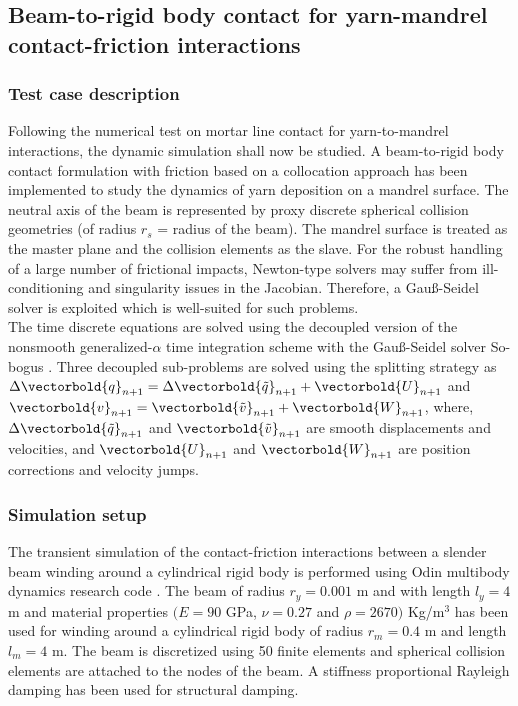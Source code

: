 \subsection{Beam-to-rigid body contact for yarn-mandrel contact-friction interactions}
\subsubsection{Test case description}
Following the numerical test on mortar line contact for yarn-to-mandrel interactions, the dynamic simulation shall now be studied. A beam-to-rigid body contact formulation with friction based on a collocation approach has been implemented to study the dynamics of yarn deposition on a mandrel surface. The neutral axis of the beam is represented by proxy discrete spherical collision geometries \cite{tasora2020geometrically} (of radius $r_s$ = radius of the beam). The mandrel surface is treated as the master plane and the collision elements as the slave. For the robust handling of a large number of frictional impacts, Newton-type solvers may suffer from ill-conditioning and singularity issues in the Jacobian. Therefore, a Gau{\ss}-Seidel solver is exploited which is well-suited for such problems.\\

The time discrete equations are solved using the decoupled version of the nonsmooth generalized-$\alpha$ time integration scheme \cite{cosimo2020robust} with the Gau{\ss}-Seidel solver So-bogus \cite{daviet2011hybrid}. Three decoupled sub-problems are solved using the splitting strategy as $\Delta \vectorbold{q}_{n+1} = \Delta \vectorbold{\Tilde{q}}_{n+1} + \vectorbold{U}_{n+1}$ and $\vectorbold{v}_{n+1} = \vectorbold{\Tilde{v}}_{n+1} + \vectorbold{W}_{n+1}$, where, $\Delta \vectorbold{\Tilde{q}}_{n+1}$ and $\vectorbold{\Tilde{v}}_{n+1}$ are smooth displacements and velocities, and $\vectorbold{U}_{n+1}$ and $\vectorbold{W}_{n+1}$ are position corrections and velocity jumps. 

\subsubsection{Simulation setup}
The transient simulation of the contact-friction interactions between a slender beam winding around a cylindrical rigid body is performed using Odin multibody dynamics research code \cite{odin2022}. The beam of radius $r_y = 0.001$ m and with length $l_y = 4$ m and material properties $(E = 90$ GPa, $\nu = 0.27$ and $\rho = 2670)$ Kg/m$^3$ has been used for winding around a cylindrical rigid body of radius  $r_m = 0.4$ m and length $l_m = 4$ m. The beam is discretized using 50 finite elements and spherical collision elements are attached to the nodes of the beam. A stiffness proportional Rayleigh damping has been used for structural damping. \\
 

